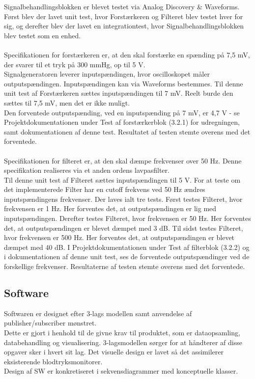 Signalbehandlingsblokken er blevet testet via Analog Discovery \& Waveforms. Først blev der lavet unit test, hvor Forstærkeren og Filteret blev testet hver for sig, og derefter blev der lavet en integrationtest, hvor Signalbehandlingsblokken blev testet som en enhed. 
\\\\
Specifikationen for forstærkeren er, at den skal forstærke en spænding på 7,5 mV, der svarer til et tryk på 300 mmHg, op til 5 V. \\
Signalgeneratoren leverer inputspændingen, hvor oscilloskopet måler outputspændingen. Inputspændingen kan via Waveforms bestemmes. Til denne unit test af Forstærkeren sættes inputspændingen til 7 mV. Reelt burde den sættes til 7,5 mV, men det er ikke muligt. \\
Den forventede outputspænding, ved en inputspænding på 7 mV, er 4,7 V - se Projektdokumentationen under Test af forstærkerblok (3.2.1) for udregningen, samt dokumentationen af denne test.
Resultatet af testen stemte overens med det forventede. 
\\\\
Specifikationen for filteret er, at den skal dæmpe frekvenser over 50 Hz. Denne specifikation realiseres via et anden ordens lavpasfilter. \\
Til denne unit test af Filteret sættes inputspændingen til 5 V. For at teste om det implementerede Filter har en cutoff frekvens ved 50 Hz ændres inputspændingens frekvenser. Der laves ialt tre tests. Først testes Filteret, hvor frekvensen er 1 Hz. Her forventes det, at outputspændingen er lig med inputspændingen. Derefter testes Filteret, hvor frekvensen er 50 Hz. Her forventes det, at outputspændingen er blevet dæmpet med 3 dB. Til sidst testes Filteret, hvor frekvensen er 500 Hz. Her forventes det, at outputspændingen er blevet dæmpet med 40 dB. I Projektdokumentationen under Test af filterblok (3.2.2) og i dokumentationen af denne unit test, ses de forventede outputspændinger ved de forskellige frekvenser.
Resultaterne af testen stemte overens med det forventede.  

    
 
 


 

\subsection{Software}
Softwaren er designet efter 3-lags modellen samt anvendelse af publisher/subscriber mønstret. \\
Dette er gjort i henhold til de givne krav til produktet, som er dataopsamling, databehandling og visualisering. 3-lagsmodellen sørger for at håndterer af disse opgaver sker i hvert sit lag. Det visuelle design er lavet så det assimilerer eksisterende blodtryksmonitorer. \\
Design af SW er konkretiseret i sekvensdiagrammer med konceptuelle klasser.
\\\\

